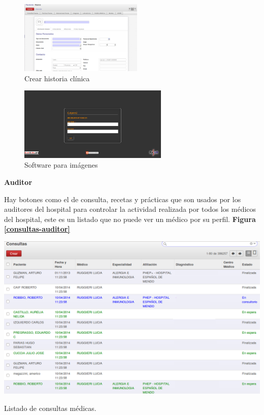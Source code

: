 \begin{correccionFigure}[h]
      \centering
      \begin{subfigure}[t]{0.48\textwidth}
        \includegraphics[height=3.5cm]{img/tp1/HE/HCUD2}
        \caption{Crear historia clínica}
        \label{hc-nueva}
      \end{subfigure}
      \hfill%
      \begin{subfigure}[t]{0.548\textwidth}
        \includegraphics[height=3.5cm]{img/tp1/HE/Imagenes}
        \caption{Software para imágenes}
        \label{sw-imagen}
	  \end{subfigure}
\end{correccionFigure}


\textbf{Auditor}

Hay botones como el de consulta, recetas y prácticas que son usados por los auditores del hospital para controlar la actividad realizada por todos los médicos del hospital, este es un listado que no puede ver un médico por su perfil. \textbf{Figura \ref{consultas-auditor}}


\begin{correccionFigure}[h]
      \centering
      \includegraphics[width=.8\textwidth]{img/tp1/HE/HCUDConsulta}
      \caption{Listado de consultas médicas.}
      \label{consultas-auditor}
\end{correccionFigure}


